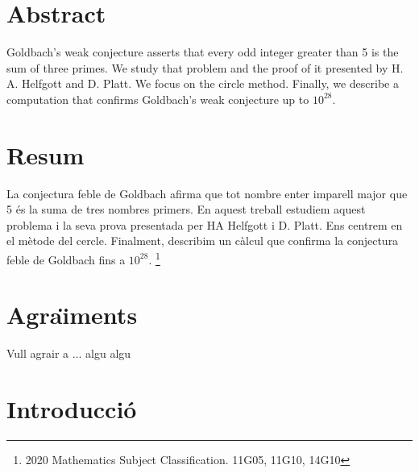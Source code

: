 \documentclass[11pt,a4paper,openright,oneside]{article}
\numberwithin{equation}{section}
\newtheorem{teo}{Teorema}[section]
\newtheorem{prop}[teo]{Proposici\'o}
\newtheorem{lema}[teo]{Lema}
\newtheorem{defi}[teo]{Definici\'o}
\theoremstyle{definition}
\newtheorem{prob}[teo]{Problema}
\newtheorem{ex}[teo]{Exemple}
\begin{document}
\newpage
{}

\section*{Abstract}

Goldbach's weak conjecture asserts that every odd integer greater than 5 is the sum of three primes. We study that problem and the proof of it presented by H. A. Helfgott and D. Platt. We focus on the circle method. Finally, we describe a computation that confirms Goldbach's weak conjecture up to $10^{28}$.

\section*{Resum}
La conjectura feble de Goldbach afirma que tot nombre enter imparell major que 5 \'es la suma de tres nombres primers. En aquest treball estudiem aquest problema i la seva prova presentada per HA Helfgott i D. Platt. Ens centrem en el m\`etode del cercle. Finalment, describim un c\`alcul que confirma la conjectura feble de Goldbach fins a $10^{28}$.
{\let\thefootnote\relax\footnote{2020 Mathematics Subject Classification. 11G05, 11G10, 14G10}}


\newpage

\section*{Agra\"{\i}ments}

Vull agrair a ... algu algu
\newpage

\tableofcontents

\newpage

\setcounter{page}{1}

\section*{Introducci\'o}

\end{document}
